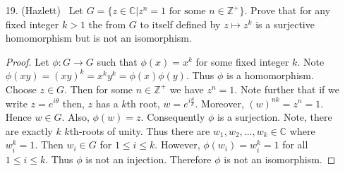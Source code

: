 \documentclass[10pt]{article}
\newcommand{\C}{\mathbb{C}}
\newcommand{\Z}{\mathbb{Z}}
\newcommand\inv{^{-1}}
\begin{document}
\begin{itemize}
\begin{proof}
First, notice that $e_G \in \ker(\phi)$ so the kernel is non-empty.
Now choose $x,y \in \ker(\phi)$.  Then $\phi(xy) = \phi(x)\phi(y) = 1_H1_H = 1_H$.  So $xy \in \ker(\phi)$ and the kernel is closed under products.  Note $\phi(x\inv) = 1_H\phi(x\inv) = \phi(x)\phi(x\inv) = \phi(xx\inv) = \phi(1_G) = 1_H$.  Consequently $x\inv \in \ker(\phi)$.  Since $\ker(\phi)$ is non-empty, closed
under products and inverses, $\ker(\phi) \leq G$.

Suppose $\ker(\phi) = \{1_G\}$ and $\phi(x) = \phi(y)$.  Thus $\phi(xy\inv) = \phi(x)\phi(y\inv) = \phi(y)\phi(y\inv) = \phi(yy\inv) = \phi(1_G) = 1_H$.  So $xy\inv \in \ker(\phi)$. This implies that $xy\inv = 1_G$.  Hence $x = y$ and $\phi$ is an injection.  Assume instead then that $\phi$ is an injection.  Let $x \in \ker(\phi)$.  Then $\phi(x) = \phi(1_G)$.  Therefore $x = 1_G$ and $\ker(\phi) = \{1_G\}$.
\end{proof}



\item[19.] (Hazlett) \ Let $G = \{z \in \C|z^n = 1 \text{ for some } n \in \Z^+\}$.  Prove that for any fixed integer $k > 1$ the from $G$ to itself defined by $z \mapsto z^k$ is a surjective homomorphism but is not an isomorphism.

\begin{proof}
Let $\phi:G\to G$ such that $\phi(x) = x^k$ for some fixed integer $k$.
Note $\phi(xy) = (xy)^k = x^ky^k = \phi(x)\phi(y)$.
Thus $\phi$ is a homomorphism.
Choose $z \in G$. Then for some $n \in \Z^+$ we have $z^n = 1$.  Note further
that if we write $z = e^{i\theta}$ then, $z$ has a $k$th root,  $w=e^{i \frac{\theta}{k}}$.  Moreover, $(w)^{nk} = z^n = 1$.  Hence $w \in G$.  Also, $\phi(w) = z$.  Consequently $\phi$ is a surjection.  Note, there are exactly $k$ $k$th-roots of unity.  Thus there are $w_1, w_2, \ldots, w_k \in \C$ where $w_i^k = 1$.  Then $w_i \in G$ for $1 \leq i \leq k$.  However, $\phi(w_i) = w_i^k = 1$ for all $1 \leq i \leq k$.  Thus $\phi$ is not an injection.  Therefore $\phi$ is not an isomorphism.
\end{proof}



\end{itemize}
\end{document}
